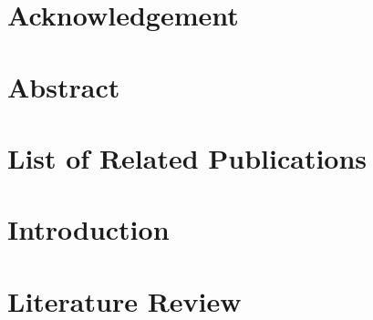 \documentclass[11pt]{book}
\renewcommand{\baselinestretch}{1.2}
\begin{document}


\newpage
\thispagestyle{empty}
\renewcommand{\thesisdedication}{{\large Copyright \copyright~Ritvik Aryan Kalra, 2024\\}{\large All Rights Reserved\\}}
\thesisdedicationpage


\mastersthesis

\newpage
\thispagestyle{empty}
\renewcommand{\thesisdedication}{{\large To my family, friends and Prof. Nimmi Rangaswamy for their constant love and support\\}}
\thesisdedicationpage

\chapter*{Acknowledgement}
\label{ch:acknowledgement}

%
\chapter*{Abstract}
\label{ch:abstract}

%
\tableofcontents
\listoffigures
\let\cleardoublepage\clearpage

\chapter*{List of Related Publications}
\label{ch:relatedPubs}


\chapter{Introduction}
\label{ch:intro}


\chapter{Literature Review}
\label{ch:literature review}


\end{document}
